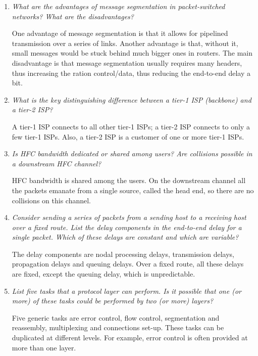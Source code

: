 \begin{enumerate}
\begin{itemize}
     \item the need to maintain connection state in the packet
       switches.

   \end{itemize}
   The main advantage of VC networks is that they allow to guarantee
   an end-to-end delay.

  \item \emph{What are the advantages of message segmentation in
    packet-switched networks? What are the disadvantages?}

  One advantage of message segmentation is that it allows for
  pipelined transmission over a series of links. Another advantage is
  that, without it, small messages would be stuck behind much bigger
  ones in routers. The main disadvantage is that message segmentation
  usually requires many headers, thus increasing the ration
  control/data, thus reducing the end-to-end delay a bit.

  \item \emph{What is the key distinguishing difference between a
    tier-1 ISP (backbone) and a tier-2 ISP?}

  A tier-1 ISP connects to all other tier-1 ISPs; a tier-2 ISP
  connects to only a few tier-1 ISPs. Also, a tier-2 ISP is a customer
  of one or more tier-1 ISPs.

  \item \emph{Is HFC bandwidth dedicated or shared among users? Are
    collisions possible in a downstream HFC channel?}

  HFC bandwidth is shared among the users. On the downstream channel
  all the packets emanate from a single source, called the head end,
  so there are no collisions on this channel.

  \item \emph{Consider sending a series of packets from a sending host
    to a receiving host over a fixed route. List the delay components
    in the end-to-end delay for a single packet. Which of these delays
    are constant and which are variable?}

  The delay components are nodal processing delays, transmission
  delays, propagation delays and queuing delays. Over a fixed route,
  all these delays are fixed, except the queuing delay, which is
  unpredictable.

  \item \emph{List five tasks that a protocol layer can perform. Is it
    possible that one (or more) of these tasks could be performed by
    two (or more) layers?}

  Five generic tasks are error control, flow control, segmentation and
  reassembly, multiplexing and connections set-up. These tasks can be
  duplicated at different levels. For example, error control is often
  provided at more than one layer.


\end{enumerate}
